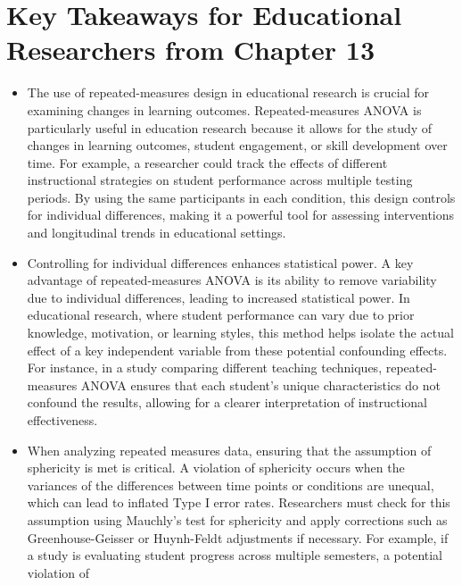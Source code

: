 \documentclass[
  letterpaper,
  DIV=11,
  numbers=noendperiod]{scrreprt}
\begin{document}
\section*{Key Takeaways for Educational Researchers from Chapter
13}\label{key-takeaways-for-educational-researchers-from-chapter-13}


\begin{itemize}
\item
  The use of repeated-measures design in educational research is crucial
  for examining changes in learning outcomes. Repeated-measures ANOVA is
  particularly useful in education research because it allows for the
  study of changes in learning outcomes, student engagement, or skill
  development over time. For example, a researcher could track the
  effects of different instructional strategies on student performance
  across multiple testing periods. By using the same participants in
  each condition, this design controls for individual differences,
  making it a powerful tool for assessing interventions and longitudinal
  trends in educational settings.
\item
  Controlling for individual differences enhances statistical power. A
  key advantage of repeated-measures ANOVA is its ability to remove
  variability due to individual differences, leading to increased
  statistical power. In educational research, where student performance
  can vary due to prior knowledge, motivation, or learning styles, this
  method helps isolate the actual effect of a key independent variable
  from these potential confounding effects. For instance, in a study
  comparing different teaching techniques, repeated-measures ANOVA
  ensures that each student's unique characteristics do not confound the
  results, allowing for a clearer interpretation of instructional
  effectiveness.
\item
  When analyzing repeated measures data, ensuring that the assumption of
  sphericity is met is critical. A violation of sphericity occurs when
  the variances of the differences between time points or conditions are
  unequal, which can lead to inflated Type I error rates. Researchers
  must check for this assumption using Mauchly's test for sphericity and
  apply corrections such as Greenhouse-Geisser or Huynh-Feldt
  adjustments if necessary. For example, if a study is evaluating
  student progress across multiple semesters, a potential violation of

\end{itemize}
\end{document}
